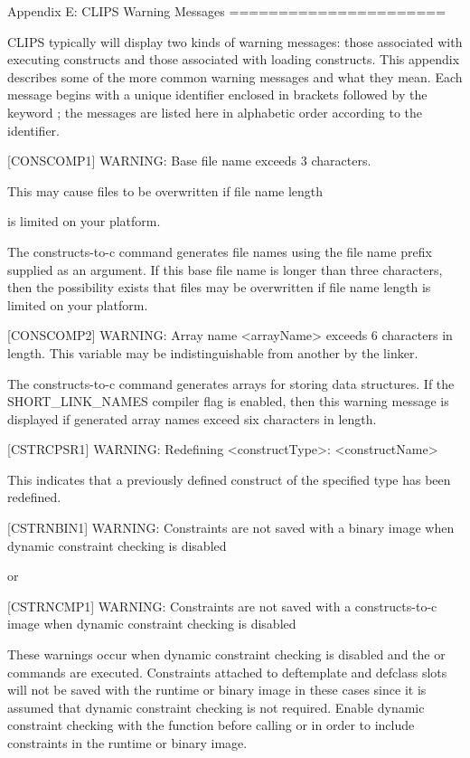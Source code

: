 \documentclass[letterpaper,10pt,english]{sphinxmanual}
\begin{document}
Appendix E:
CLIPS Warning Messages
======================

CLIPS typically will display two kinds of warning messages: those
associated with executing constructs and those associated with loading
constructs. This appendix describes some of the more common warning
messages and what they mean. Each message begins with a unique
identifier enclosed in brackets followed by the keyword ; the
messages are listed here in alphabetic order according to the
identifier.

{[}CONSCOMP1{]} WARNING: Base file name exceeds 3 characters.

This may cause files to be overwritten if file name length

is limited on your platform.

The constructs-to-c command generates file names using the file name
prefix supplied as an argument. If this base file name is longer than
three characters, then the possibility exists that files may be
overwritten if file name length is limited on your platform.

{[}CONSCOMP2{]} WARNING: Array name \textless{}arrayName\textgreater{} exceeds 6 characters in
length. This variable may be indistinguishable from another by the
linker.

The constructs-to-c command generates arrays for storing data
structures. If the SHORT\_LINK\_NAMES compiler flag is enabled, then this
warning message is displayed if generated array names exceed six
characters in length.

{[}CSTRCPSR1{]} WARNING: Redefining \textless{}constructType\textgreater{}: \textless{}constructName\textgreater{}

This indicates that a previously defined construct of the specified type
has been redefined.

{[}CSTRNBIN1{]} WARNING: Constraints are not saved with a binary image when
dynamic constraint checking is disabled

or

{[}CSTRNCMP1{]} WARNING: Constraints are not saved with a constructs-to-c
image when dynamic constraint checking is disabled

These warnings occur when dynamic constraint checking is disabled and
the  or  commands are executed. Constraints
attached to deftemplate and defclass slots will not be saved with the
runtime or binary image in these cases since it is assumed that dynamic
constraint checking is not required. Enable dynamic constraint checking
with the  function before calling
 or  in order to include constraints in the
runtime or binary image.
\end{document}

